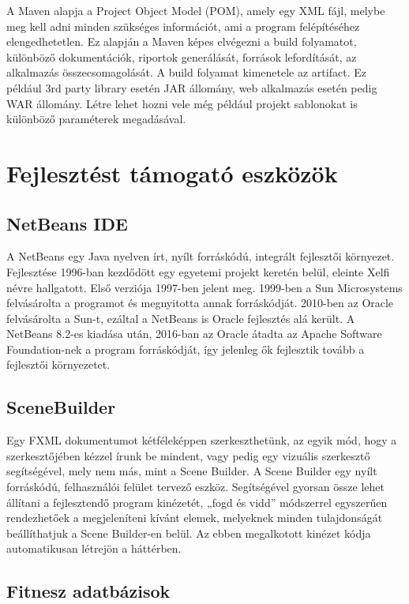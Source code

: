 A Maven alapja a Project Object Model (POM), amely egy XML fájl, melybe meg kell adni minden szükséges információt, ami a program felépítéséhez elengedhetetlen. Ez alapján a Maven képes elvégezni a build folyamatot, különböző dokumentációk, riportok generálását, források lefordítását, az alkalmazás összecsomagolását. A build folyamat kimenetele az artifact. Ez például 3rd party library esetén JAR állomány, web alkalmazás esetén pedig WAR állomány. Létre lehet hozni vele még például projekt sablonokat is különböző paraméterek megadásával. 

\section{Fejlesztést támogató eszközök}

\subsection{NetBeans IDE} 

A NetBeans egy Java nyelven írt, nyílt forráskódú, integrált fejlesztői környezet. Fejlesztése 1996-ban kezdődött egy egyetemi projekt keretén belül, eleinte Xelfi névre hallgatott. Első verziója 1997-ben jelent meg. 1999-ben a Sun Microsystems felvásárolta a programot és megnyitotta annak forráskódját. 2010-ben az Oracle felvásárolta a Sun-t, ezáltal a NetBeans is Oracle fejlesztés alá került. A NetBeans 8.2-es kiadása után, 2016-ban az Oracle átadta az Apache Software Foundation-nek a program forráskódját, így jelenleg ők fejlesztik tovább a fejlesztői környezetet.

\subsection{SceneBuilder}

Egy FXML dokumentumot kétféleképpen szerkeszthetünk, az egyik mód, hogy a szerkesztőjében kézzel írunk be mindent, vagy pedig egy vizuális szerkesztő segítségével, mely nem más, mint a Scene Builder. A Scene Builder egy nyílt forráskódú, felhasználói felület tervező eszköz. Segítségével gyorsan össze lehet állítani a fejlesztendő program kinézetét, „fogd és vidd” módszerrel egyszerűen rendezhetőek a megjeleníteni kívánt elemek, melyeknek minden tulajdonságát beállíthatjuk a Scene Builder-en belül. Az ebben megalkotott kinézet kódja automatikusan létrejön a háttérben.

\subsection{Fitnesz adatbázisok}

